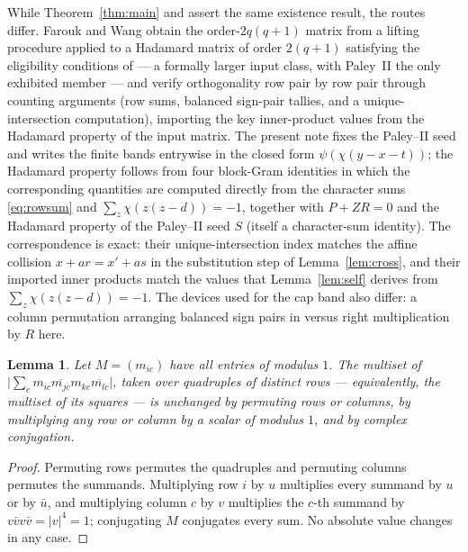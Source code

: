 \documentclass[11pt]{article}
\newtheorem{lemma}{Lemma}
\begin{document}
While Theorem~\ref{thm:main} and \cite[Cor.~2.1]{FaroukWang2020} assert
the same existence result, the routes differ.  Farouk and Wang obtain
the order-\(2q(q+1)\) matrix from a lifting procedure applied to a
Hadamard matrix of order \(2(q+1)\) satisfying the eligibility
conditions of \cite[Lem.~2.2]{FaroukWang2020} --- a formally larger
input class, with Paley~II the only exhibited member --- and verify
orthogonality row pair by row pair through counting arguments (row
sums, balanced sign-pair tallies, and a unique-intersection
computation), importing the key inner-product values from the Hadamard
property of the input matrix.  The present note fixes the Paley--II
seed and writes the finite bands entrywise in the closed form
\(\psi(\chi(y-x-t))\); the Hadamard property follows from four
block-Gram identities in which the corresponding quantities are
computed directly from the character sums \eqref{eq:rowsum} and
\(\sum_{z}\chi(z(z-d))=-1\), together with \(P+ZR=0\) and the
Hadamard property of the Paley--II seed \(S\) (itself a
character-sum identity).  The
correspondence is exact: their unique-intersection index matches the
affine collision \(x+ar=x'+as\) in the substitution step of
Lemma~\ref{lem:cross}, and their imported inner products match the
values that Lemma~\ref{lem:self} derives from
\(\sum_{z}\chi(z(z-d))=-1\).  The devices used for the cap band also
differ: a column permutation arranging balanced sign pairs in
\cite{FaroukWang2020} versus right multiplication by \(R\) here.

\begin{lemma}\label{lem:quadinv}
Let \(M=(m_{ic})\) have all entries of modulus \(1\).  The multiset of
\(\bigl|\sum_cm_{ic}\overline{m_{jc}}m_{kc}\overline{m_{lc}}\bigr|\), taken
over quadruples of distinct rows --- equivalently, the multiset of its
squares --- is unchanged by permuting rows or columns, by multiplying any row
or column by a scalar of modulus \(1\), and by complex conjugation.
\end{lemma}

\begin{proof}
Permuting rows permutes the quadruples and permuting columns permutes the
summands.  Multiplying row \(i\) by \(u\) multiplies every summand by \(u\)
or by \(\bar u\), and multiplying column \(c\) by \(v\) multiplies the
\(c\)-th summand by \(v\bar vv\bar v=|v|^{4}=1\); conjugating \(M\) conjugates
every sum.  No absolute value changes in any case.
\end{proof}
\end{document}
